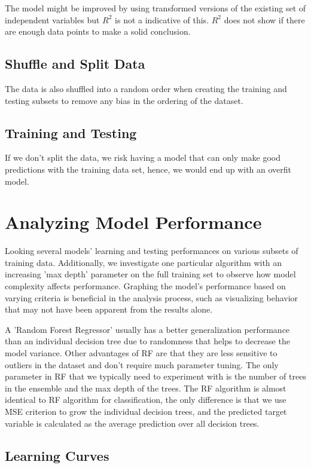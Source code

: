 \documentclass[a4project, twocolumn]{article}
\begin{document}
The model might be improved by using transformed versions of the existing set of independent variables but $R^2$ is not a indicative of this. $R^2$ does not show if there are enough data points to make a solid conclusion.

\subsection{Shuffle and Split Data}

The data is also shuffled into a random order when creating the training and testing subsets to remove any bias in the ordering of the dataset.

\subsection{Training and Testing}

If we don't split the data, we risk having a model that can only make good predictions with the training data set, hence, we would end up with an overfit model.

\section{Analyzing Model Performance}

Looking several models' learning and testing performances on various subsets of training data. Additionally, we investigate one particular algorithm with an increasing 'max depth' parameter on the full training set to observe how model complexity affects performance. Graphing the model's performance based on varying criteria is beneficial in the analysis process, such as visualizing behavior that may not have been apparent from the results alone.

A 'Random Forest Regressor' usually has a better generalization performance than an individual decision tree due to randomness that helps to decrease the model variance. Other advantages of RF are that they are less sensitive to outliers in the dataset and don't require much parameter tuning. The only parameter in RF that we typically need to experiment with is the number of trees in the ensemble and the max depth of the trees. The RF algorithm is almost identical to RF algorithm for classification, the only difference is that we use MSE criterion to grow the individual decision trees, and the predicted target variable is calculated as the average prediction over all decision trees.

\subsection{Learning Curves}
\end{document}
